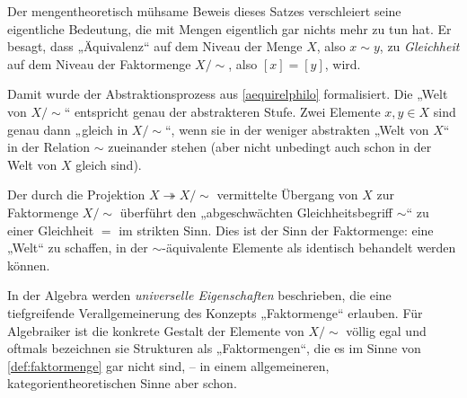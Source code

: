 \begin{bem}
    Der mengentheoretisch mühsame Beweis dieses Satzes verschleiert seine eigentliche Bedeutung, die mit Mengen eigentlich gar nichts mehr zu tun hat. Er besagt, dass „Äquivalenz“ auf dem Niveau der Menge $X$, also $x\sim y$, zu \emph{Gleichheit} auf dem Niveau der Faktormenge $X/{\sim}$, also $[x]=[y]$, wird.
    
    Damit wurde der Abstraktionsprozess aus \cref{aequirelphilo} formalisiert. Die „Welt von $X/{\sim}$“ entspricht genau der abstrakteren Stufe. Zwei Elemente $x,y\in X$ sind genau dann „gleich in $X/{\sim}$“, wenn sie in der weniger abstrakten „Welt von $X$“ in der Relation $\sim$ zueinander stehen (aber nicht unbedingt auch schon in der Welt von $X$ gleich sind).

    Der durch die Projektion $X\twoheadrightarrow X/{\sim}$ vermittelte Übergang von $X$ zur Faktormenge $X/{\sim}$ überführt den „abgeschwächten Gleichheitsbegriff $\sim$“ zu einer Gleichheit $=$ im strikten Sinn. Dies ist der Sinn der Faktormenge: eine „Welt“ zu schaffen, in der $\sim$-äquivalente Elemente als identisch behandelt werden können.
    
    In der Algebra werden \emph{universelle Eigenschaften} beschrieben, die eine tiefgreifende Verallgemeinerung des Konzepts „Faktormenge“ erlauben. Für Algebraiker ist die konkrete Gestalt der Elemente von $X/{\sim}$ völlig egal und oftmals bezeichnen sie Strukturen als „Faktormengen“, die es im Sinne von \cref{def:faktormenge} gar nicht sind, -- in einem allgemeineren, kategorientheoretischen Sinne aber schon.
\end{bem}


